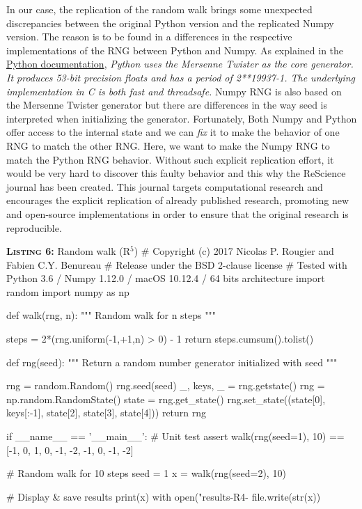 \documentclass[a4paper,11pt]{article}
\begin{document}
In our case, the replication of the random walk brings some unexpected
discrepancies between the original Python version and the replicated Numpy
version.  The reason is to be found in a differences in the respective
implementations of the RNG between Python and Numpy.  As explained in the
\href{https://docs.python.org/3.6/library/random.html}{Python documentation},
     {\em Python uses the Mersenne Twister as the core generator. It produces
      53-bit precision floats and has a period of 2**19937-1.  The underlying
       implementation in C is both fast and threadsafe.}  Numpy RNG is also
     based on the Mersenne Twister generator but there are differences in the
     way seed is interpreted when initializing the generator.  Fortunately,
     Both Numpy and Python offer access to the internal state and we can {\em
       fix} it to make the behavior of one RNG to match the other RNG.  Here,
     we want to make the Numpy RNG to match the Python RNG behavior.
%
Without such explicit replication effort, it would be very hard to discover
this faulty behavior and this why the ReScience journal has been created.  This
journal targets computational research and encourages the explicit replication
of already published research, promoting new and open-source implementations in
order to ensure that the original research is reproducible.

\begin{code}{\textbf{\textsc{Listing 6:}} Random walk (R$^5$)}
# Copyright (c) 2017 Nicolas P. Rougier and Fabien C.Y. Benureau
# Release under the BSD 2-clause license
# Tested with Python 3.6 / Numpy 1.12.0 / macOS 10.12.4 / 64 bits architecture
import random
import numpy as np

def walk(rng, n):
    """ Random walk for n steps """

    steps = 2*(rng.uniform(-1,+1,n) > 0) - 1
    return steps.cumsum().tolist()

def rng(seed):
    """ Return a random number generator initialized with seed """ 
    
    rng = random.Random()
    rng.seed(seed)
    _, keys, _ = rng.getstate()
    rng = np.random.RandomState()
    state = rng.get_state()
    rng.set_state((state[0], keys[:-1], state[2], state[3], state[4]))
    return rng

if __name__ == '__main__':
    # Unit test
    assert walk(rng(seed=1), 10) == [-1, 0, 1, 0, -1, -2, -1, 0, -1, -2]

    # Random walk for 10 steps
    seed = 1
    x = walk(rng(seed=2), 10)

    # Display & save results
    print(x)
    with open("results-R4-%
        file.write(str(x))
\end{code}
\end{document}

